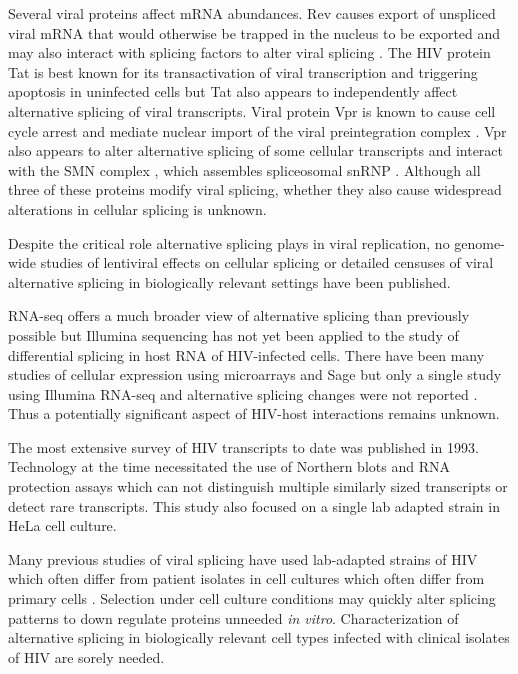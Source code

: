 \documentclass[../sherrill-Mix_thesis.tex]{subfiles}
\begin{document}
	Several viral proteins affect mRNA abundances. Rev causes export of unspliced viral mRNA that would otherwise be trapped in the nucleus \citep{Legrain1989} to be exported \citep{Fischer1994,Pollard1998} and may also interact with splicing factors to alter viral splicing \citep{Tange1996}. The HIV protein Tat is best known for its transactivation of viral transcription \citep{Sodroski1985,Jones1994} and triggering apoptosis in uninfected cells \citep{McCloskey1997,Campbell2004} but Tat also appears to independently affect alternative splicing of viral transcripts\citep{Berro2006,Bohne2007,Jablonski2010,Miller2011}. Viral protein Vpr is known to cause cell cycle arrest \citep{Rogel1995} and mediate nuclear import of the viral preintegration complex \citep{Fouchier1998}. Vpr also appears to alter alternative splicing of some cellular transcripts \citep{Kuramitsu2005,Hashizume2007} and interact with the SMN complex \citep{Jager2012}, which assembles spliceosomal snRNP \citep{Gubitz2004}. Although all three of these proteins modify viral splicing, whether they also cause widespread alterations in cellular splicing is unknown.

	Despite the critical role alternative splicing plays in viral replication, no genome-wide studies of lentiviral effects on cellular splicing or  detailed censuses of viral alternative splicing in biologically relevant settings have been published.

	RNA-seq offers a much broader view of alternative splicing than previously possible \citep{Trapnell2010,Rogers2012} but Illumina sequencing has not yet been applied to the study of differential splicing in host RNA of HIV-infected cells. There have been many studies of cellular expression using microarrays \citep{Vahey2002,Wout2003,Mitchell2003,Rotger2010,Miller2011} and Sage \citep{Ryo1999,Lefebvre2011} but only a single study using Illumina RNA-seq and alternative splicing changes were not reported \citep{Chang2011}. Thus a potentially significant aspect of HIV-host interactions remains unknown.

	The most extensive survey of HIV transcripts to date was published in 1993\citep{Purcell1993}. Technology at the time necessitated the use of Northern blots and RNA protection assays \citep{Purcell1993} which can not distinguish multiple similarly sized transcripts or detect rare transcripts. This study also focused on a single lab adapted \hivNL{} strain in HeLa cell culture.

	Many previous studies of viral splicing have used lab-adapted strains of HIV which often differ from patient isolates \citep{Fujita1992} in cell cultures which often differ from primary cells \citep{McAllister1971}. Selection under cell culture conditions may quickly alter splicing patterns to down regulate proteins unneeded \emph{in vitro}.  Characterization of alternative splicing in biologically relevant cell types infected with clinical isolates of HIV are sorely needed.
\end{document}

